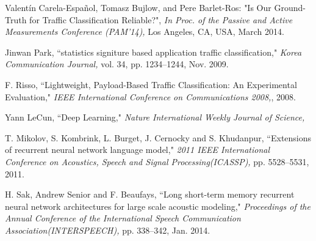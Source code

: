 \documentclass[10pt, twoside, jounal]{IEEEtran}
\begin{document}
\ifCLASSOPTIONcaptionsoff
  \newpage
\fi



\begin{thebibliography}{1}
Valentín Carela-Español, Tomasz Bujlow, and Pere Barlet-Ros: "Is Our Ground-Truth for Traffic Classification Reliable?",  {\it In Proc. of the Passive and Active Measurements Conference (PAM'14),} Los Angeles, CA, USA, March 2014.

Jinwan Park, ``statistics signiture based application traffic classification," {\it Korea Communication Journal,} vol. 34, pp. 1234--1244, Nov. 2009.

F. Risso, ``Lightweight, Payload-Based Traffic Classification: An Experimental Evaluation," {\it IEEE International Conference on Communications 2008,}, 2008.

Yann LeCun, ``Deep Learning," {\it Nature International Weekly Journal of Science,}

T. Mikolov, S. Kombrink, L. Burget, J. Cernocky and S. Khudanpur, ``Extensions of recurrent neural network language model," {\it 2011 IEEE International Conference on Acoustics, Speech and Signal Processing(ICASSP),} pp. 5528--5531, 2011.

H. Sak, Andrew Senior and F. Beaufays, ``Long short-term memory recurrent neural network architectures for large scale acoustic modeling," {\it Proceedings of the Annual Conference of the International Speech Communication Association(INTERSPEECH),} pp. 338--342, Jan. 2014.








\end{thebibliography}
\end{document}
